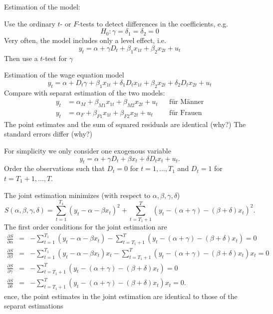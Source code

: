 \documentclass{article}
\begin{document}
Estimation of the model: 

Use the ordinary $t$- or $F$-tests to detect differences in the
coefficients, e.g.
\[ H_{0}:\gamma =\delta _{1}=\delta _{2}=0 \]
Very often, the model includes only a level effect, i.e.
\[ y_{t}=\alpha +\gamma D_{t}+\beta _{1}x_{1t}+\beta _{2}x_{2t}+u_{t} \]
Then use a $t$-test for $\gamma $

Estimation of the wage equation model
\[ y_{t}=\alpha +D_{t}\gamma +\beta _{1}x_{1t}+\delta _{1}D_{t}x_{1t}
+\beta_{2}x_{2t}+\delta _{2}D_{t}x_{2t}+u_{t} \]
 Compare with separat estimation of the two models: 
\begin{align*}
y_{t}&=\alpha _{M}+\beta _{M1}x_{1t}+\beta _{M2}x_{2t}+u_{t} &&\text{für Männer} \\ 
y_{t}&=\alpha _{F}+\beta _{F1}x_{1t}+\beta _{F2}x_{2t}+u_{t} &&\text{für Frauen}
\end{align*}
The point estimates and the sum of squared residuals are identical
(why?)
The standard errors differ (why?)

For simplicity we only consider one exogenous variable
\[ y_{t}=\alpha +\gamma D_{t}+\beta x_{t}+\delta D_{t}x_{t}+u_{t}. \]
Order the observations such that $D_{t}=0$ for $t=1,\ldots ,T_{1}$ and 
$D_{t}=1$ for $t=T_{1}+1,\ldots ,T$.

The joint estimation minimizes (with respect to $\alpha ,\beta ,\gamma,\delta $)
\begin{equation*}
S\left( \alpha ,\beta ,\gamma ,\delta \right) =\sum_{t=1}^{T_{1}}\left(
y_{t}-\alpha -\beta x_{t}\right) ^{2}+\sum_{t=T_{1}+1}^{T}\left(
y_{t}-\left( \alpha +\gamma \right) -\left( \beta +\delta \right)
x_{t}\right) ^{2}.
\end{equation*}
The first order conditions for the joint estimation are
\begin{eqnarray*}
\frac{\partial S}{\partial \alpha } &=&-\sum_{t=1}^{T_{1}}\left(
y_{t}-\alpha -\beta x_{t}\right) -\sum_{t=T_{1}+1}^{T}\left( y_{t}-\left(
\alpha +\gamma \right) -\left( \beta +\delta \right) x_{t}\right) =0 \\
\frac{\partial S}{\partial \beta } &=&-\sum_{t=1}^{T_{1}}\left( y_{t}-\alpha
-\beta x_{t}\right) x_{t}-\sum_{t=T_{1}+1}^{T}\left( y_{t}-\left( \alpha
+\gamma \right) -\left( \beta +\delta \right) x_{t}\right) x_{t}=0 \\
\frac{\partial S}{\partial \gamma } &=&-\sum_{t=T_{1}+1}^{T}\left(
y_{t}-\left( \alpha +\gamma \right) -\left( \beta +\delta \right)
x_{t}\right) =0 \\
\frac{\partial S}{\partial \delta } &=&-\sum_{t=T_{1}+1}^{T}\left(
y_{t}-\left( \alpha +\gamma \right) -\left( \beta +\delta \right)
x_{t}\right) x_{t}=0.
\end{eqnarray*}
ence, the point estimates in the joint estimation are identical to
those of the separat estimations
\end{document}

